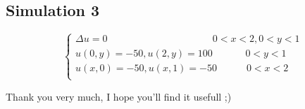 \documentclass{article}
\begin{document}
\subsection{Simulation 3}
\[ \left\{
  \begin{array}{lr}
    \Delta u = 0 \hspace{128pt} 0<x<2,0<y<1\\
    u(0,y) = -50 , u(2,y) = 100 \hspace{40pt} 0<y<1 \\
    u(x,0) = -50 , u(x,1) = -50 \hspace{36pt} 0<x<2 \\
  \end{array}
\right.
\]

Thank you very much, I hope you'll find it usefull ;)
\end{document}
